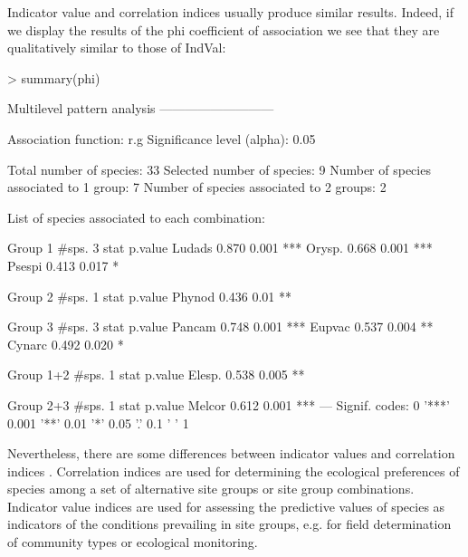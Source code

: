 \documentclass[11pt,a4paper]{article}
\begin{document}
Indicator value and correlation indices usually produce similar results. Indeed, if we display the results of the phi coefficient of association we see that they are qualitatively similar to those of IndVal: 
\begin{Schunk}
\begin{Sinput}
> summary(phi)
\end{Sinput}
\begin{Soutput}
 Multilevel pattern analysis
 ---------------------------

 Association function: r.g
 Significance level (alpha): 0.05

 Total number of species: 33
 Selected number of species: 9 
 Number of species associated to 1 group: 7 
 Number of species associated to 2 groups: 2 

 List of species associated to each combination: 

 Group 1  #sps.  3 
        stat p.value    
Ludads 0.870   0.001 ***
Orysp. 0.668   0.001 ***
Psespi 0.413   0.017 *  

 Group 2  #sps.  1 
        stat p.value   
Phynod 0.436    0.01 **

 Group 3  #sps.  3 
        stat p.value    
Pancam 0.748   0.001 ***
Eupvac 0.537   0.004 ** 
Cynarc 0.492   0.020 *  

 Group 1+2  #sps.  1 
        stat p.value   
Elesp. 0.538   0.005 **

 Group 2+3  #sps.  1 
        stat p.value    
Melcor 0.612   0.001 ***
---
Signif. codes:  0 '***' 0.001 '**' 0.01 '*' 0.05 '.' 0.1 ' ' 1 
\end{Soutput}
\end{Schunk}
Nevertheless, there are some differences between indicator values and correlation indices \citep{DeCaceres2008}\citep{DeCaceres2009}. Correlation indices are used for determining the ecological preferences of species among a set of alternative site groups or site group combinations. Indicator value indices are used for assessing the predictive values of species as indicators of the conditions prevailing in site groups, e.g. for field determination of community types or ecological monitoring.
\end{document}

